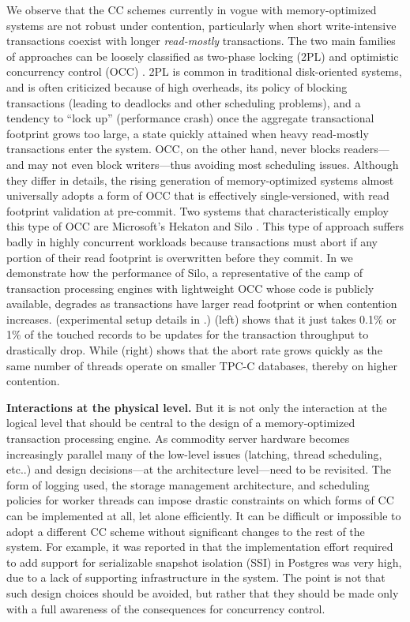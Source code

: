 We observe that the CC schemes currently in vogue with memory-optimized systems are not robust under contention, particularly when short write-intensive transactions coexist with longer \textit{read-mostly} transactions.
The two main families of approaches can be loosely classified as two-phase locking (2PL) \cite{GrayR92} and optimistic concurrency control (OCC) \cite{KungR81}. 2PL is common in traditional disk-oriented systems, and is often criticized because of high overheads, its policy of blocking transactions (leading to deadlocks and other scheduling problems), and a tendency to ``lock up'' (performance crash) once the aggregate transactional footprint grows too large, a state quickly attained when heavy read-mostly transactions enter the system. OCC, on the other hand, never blocks readers---and may not even block writers---thus avoiding most scheduling issues. Although they differ in details, the rising generation of memory-optimized systems almost universally adopts a form of OCC that is effectively single-versioned, with read footprint validation at pre-commit.  Two systems that characteristically employ this type of OCC are Microsoft's Hekaton \cite{LarsonBDFPZ11} and Silo \cite{TuZKLM13}. This type of approach suffers badly in highly concurrent workloads \cite{YuBPDS14} because transactions must abort if any portion of their read footprint is overwritten before they commit. 
In  we demonstrate how the performance of Silo, a representative of the camp of transaction processing engines with lightweight OCC whose code is publicly available, degrades as transactions have larger read footprint or when contention increases. (experimental setup details in .) (left) shows that it just takes 0.1\% or 1\% of the touched records to be updates for the transaction throughput to drastically drop. While (right) shows that the abort rate grows quickly as the same number of threads operate on smaller TPC-C databases, thereby on higher contention.


\vspace{2mm}
{\bf Interactions at the physical level.} 
But it is not only the interaction at the logical level that should be central to the design of a memory-optimized transaction processing engine. As commodity server hardware becomes increasingly parallel many of the low-level issues (latching, thread scheduling, etc..) and design decisions---at the architecture level---need to be revisited. The form of logging used, the storage management architecture, and scheduling policies for worker threads can impose drastic constraints on which forms of CC can be implemented at all, let alone efficiently. 
It can be difficult or impossible to adopt a different CC scheme without significant changes to the rest of the system. 
For example, it was reported in \cite{PortsG12} that the implementation effort required to add support for serializable snapshot isolation (SSI) in Postgres was very high, due to a lack of supporting infrastructure in the system. 
The point is not that such design choices should be avoided, but rather that they should be made only with a full awareness of the consequences for concurrency control. 

